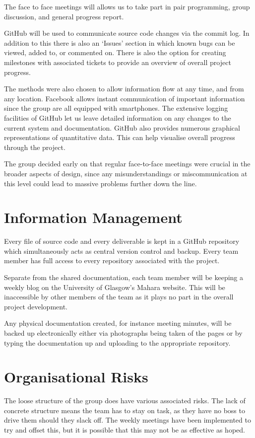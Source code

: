 \documentclass{l3deliverable}
\begin{document}
The face to face meetings will allows us to take part in pair programming,
group discussion, and general progress report.

GitHub will be used to communicate source code changes via the commit log. In
addition to this there is also an `Issues' section in which known bugs can be
viewed, added to, or commented on. There is also the option for creating
milestones with associated tickets to provide an overview of overall project
progress.

The methods were also chosen to allow information flow at any time, and from
any location. Facebook allows instant communication of important information
since the group are all equipped with smartphones. The extensive logging
facilities of GitHub let us leave detailed information on any changes to the
current system and documentation. GitHub also provides numerous graphical
representations of quantitative data. This can help visualise overall
progress through the project.

The group decided early on that regular face-to-face meetings were crucial
in the broader aspects of design, since any misunderstandings or
miscommunication at this level could lead to massive problems further down
the line.

\section{Information Management}

Every file of source code and every deliverable is kept in a GitHub repository
which simultaneously acts as central version control and backup. Every
team member has full access to every repository associated with the project.

Separate from the shared documentation, each team member will be keeping a
weekly blog on the University of Glasgow's Mahara website. This will be
inaccessible by other members of the team as it plays no part in the overall
project development.

Any physical documentation created, for instance meeting minutes, will be
backed up electronically either via photographs being taken of the pages or
by typing the documentation up and uploading to the appropriate repository.

\section{Organisational Risks}

The loose structure of the group does have various associated risks. The
lack of concrete structure means the team has to stay on task, as they
have no boss to drive them should they slack off. The weekly meetings
have been implemented to try and offset this, but it is possible that this
may not be as effective as hoped.
\end{document}
